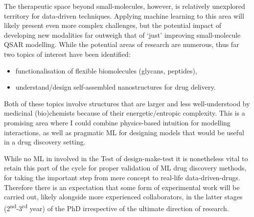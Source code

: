 The therapeutic space beyond small-molecules, however, is relatively unexplored territory for data-driven techniques. Applying machine learning to this area will likely present even more complex challenges, but the potential impact of developing new modalities far outweigh that of `just' improving small-molecule QSAR modelling. While the potential areas of research are numerous, thus far two topics of interest have been identified:

\begin{itemize}
    \item functionalisation of flexible biomolecules (glycans, peptides),
    \item understand/design self-assembled nanostructures for drug delivery.
\end{itemize}

Both of these topics involve structures that are larger and less well-understood by medicinal (bio)chemists because of their energetic/entropic complexity. This is a promising area where I could combine physics-based intuition for modelling interactions, as well as pragmatic ML for designing models that would be useful in a drug discovery setting.

While no ML in involved in the Test of design-make-test it is nonetheless vital to retain this part of the cycle for proper validation of ML drug discovery methods, for taking the important step from mere concept to real-life data-driven-drugs. Therefore there is an expectation that some form of experimental work will be carried out, likely alongside more experienced collaborators, in the latter stages (2\textsuperscript{nd}-3\textsuperscript{rd} year) of the PhD irrespective of the ultimate direction of research.